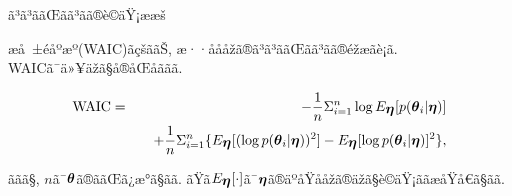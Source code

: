 \documentclass[dvipdfmx]{beamer} %
\newcommand{\bm}[1]{\mbox{\boldmath $#1$}}
\begin{document}
\begin{frame}{ã³ã³ããŒãã³ãã®è©äŸ¡ææš}

æå ±éåºæº(WAIC)ãçšããŠ, æ··åååžã®ã³ã³ããŒãã³ãã®éžæãè¡ã. WAICã¯ä»¥äžã§å®åŒåããã.

\vspace{-0.2cm}
\begin{eqnarray*}
\mbox{WAIC} &=& - \frac{1}{n} \Sigma^n_{i=1} \log E_{\bm \eta}[p(\bm \theta_i| \bm \eta)] \\
&&\quad + \frac{1}{n} \Sigma^n_{i=1} \{ E_{\bm \eta}[(\log p(\bm \theta_i| \bm \eta))^2] - E_{\bm \eta}[\log p(\bm \theta_i| \bm \eta)]^2 \}, 
\end{eqnarray*}

\noindent
ããã§, $n$ã¯$\bm \theta$ã®ããŒã¿æ°ã§ãã. ãŸã$E_{\bm \eta}[\cdot]$ã¯$\bm \eta$ã®äºåŸååžã®äžã§è©äŸ¡ããæåŸå€ã§ãã.  

\vspace{-0.3cm}
\begin{table}[tbp]
\caption{WAICã«ããã³ã³ããŒãã³ãã®éžæçµæ}
\label{WAIC2}
\begin{center}
\end{center}
\end{table}

\end{frame}
\end{document}
